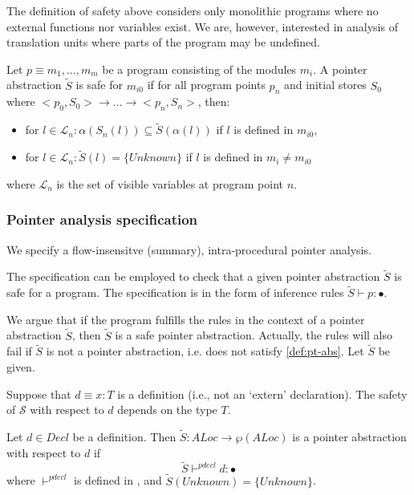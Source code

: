 The definition of safety above considers only monolithic programs where no
external functions nor variables exist. We are, however, interested in analysis
of translation units where parts of the program may be undefined.

\begin{Definition}
  Let $p \equiv m_1, \dots, m_m$ be a program consisting of the modules $m_i$.
  A pointer abstraction $\tilde{S}$ is safe for $m_{i0}$ if for all program
  points $p_n$ and initial stores $S_0$ where
  $<p_0,S_0> \rightarrow \dots \rightarrow <p_n,S_n>$, then:
  \begin{itemize}
  \item for
    $l \in \mathcal{L}_n : \alpha(S_n(l)) \subseteq \tilde{S}(\alpha(l))$ if $l$
    is defined in $m_{i0}$,
  \item for $l \in \mathcal{L}_n : \tilde{S}(l) = \{Unknown\}$ if $l$ is defined
    in $m_i \neq m_{i0}$
  \end{itemize}
  where $\mathcal{L}_n$ is the set of visible variables at program point $n$.
\end{Definition}

\subsubsection{Pointer analysis specification}

We specify a flow-insensitve (summary), intra-procedural pointer analysis.

The specification can be employed to check that a given pointer abstraction
$\tilde{S}$ is safe for a program. The specification is in the form of inference
rules $\tilde{S} \vdash p : \bullet$.

We argue that if the program fulfills the rules in the context of a pointer
abstraction $\tilde{S}$, then $\tilde{S}$ is a safe pointer abstraction.
Actually, the rules will also fail if $\tilde{S}$ is not a pointer abstraction,
i.e. does not satisfy \autoref{def:pt-abs}. Let $\tilde{S}$ be given.

Suppose that $d \equiv x : T$ is a definition (i.e., not an `extern'
declaration). The safety of $\mathcal{S}$ with respect to $d$ depends on the
type $T$.

\begin{Lemma}
  Let $d \in Decl$ be a definition. Then
  $\tilde{S} : ALoc \rightarrow \wp(ALoc)$ is a pointer abstraction with respect
  to $d$ if
  $$\tilde{S} \vdash^{pdecl} d : \bullet$$
  where $\vdash^{pdecl}$ is defined in , and $\tilde{S}(Unknown) = \{Unknown\}$.
\end{Lemma}
